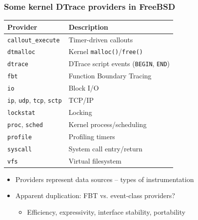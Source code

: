 \begin{frame}
  \frametitle{Some kernel DTrace providers in FreeBSD}

  \begin{center}
  \begin{small}
  \begin{tabular}{ll}
    \hline
      \textbf{Provider} & \textbf{Description} \\
    \hline
      \texttt{callout\_execute} & Timer-driven callouts \\
      \texttt{dtmalloc} & Kernel \texttt{malloc()}/\texttt{free()} \\
      \texttt{dtrace} & DTrace script events (\texttt{BEGIN}, \texttt{END}) \\
      \texttt{fbt} & Function Boundary Tracing \\
      \texttt{io} & Block I/O \\
      \texttt{ip}, \texttt{udp}, \texttt{tcp}, \texttt{sctp}  & TCP/IP \\
      \texttt{lockstat} & Locking \\
      \texttt{proc}, \texttt{sched} & Kernel process/scheduling \\
      \texttt{profile} & Profiling timers \\
      \texttt{syscall} & System call entry/return \\
      \texttt{vfs} & Virtual filesystem \\
    \hline
  \end{tabular}
  \end{small}
  \end{center}

  \begin{itemize}
    \item Providers represent data sources -- types of instrumentation
    \item Apparent duplication: FBT vs. event-class providers?
    \begin{itemize}
      \item Efficiency, expressivity, interface stability, portability
    \end{itemize}
  \end{itemize}

\end{frame}

